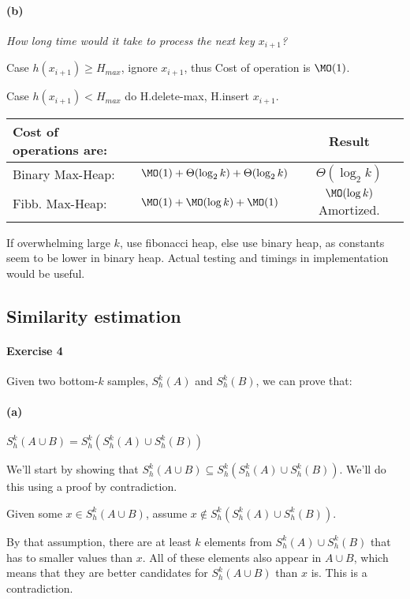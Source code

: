\paragraph*{(b)} \textit{How long time would it take to process the next key $x_{i+1}$?}

Case $h(x_{i+1}) \geq H_{max}$, ignore $x_{i+1}$, thus Cost of operation is $\MO(1)$.

Case $h(x_{i+1}) < H_{max}$ do H.delete-max, H.insert $x_{i+1}$.

\begin{tabular}{llc}
Cost of operations are: & & Result \\ \hline
Binary Max-Heap:& $\MO(1) + \Theta(\log_2 k) + \Theta(\log_2 k)$ & $\Theta(\log_2 k)$ \\
Fibb. Max-Heap: &$\MO(1) + \MO(\log k) + \MO(1)$ & $\MO(\log k)$ Amortized.
\end{tabular}


If overwhelming large $k$, use fibonacci heap, else use binary heap, as constants seem to be lower in binary heap. Actual testing and timings in implementation would be useful.

\subsection{Similarity estimation}

\paragraph{Exercise 4}
Given two bottom-$k$ samples, $S^k_h(A)$ and $S^k_h(B)$, we can prove that:

\paragraph*{(a)}
$S^k_h(A \cup B) = S^k_h(S^k_h(A) \cup S^k_h(B))$

We'll start by showing that $S^k_h(A \cup B) \subseteq S^k_h(S^k_h(A) \cup S^k_h(B))$. We'll do this using a proof by contradiction.

Given some $x \in S^k_h(A \cup B)$, assume $x \notin S^k_h(S^k_h(A) \cup S^k_h(B))$.

By that assumption, there are at least $k$ elements from $S^k_h(A) \cup S^k_h(B)$ that has to smaller values than $x$. All of these elements also appear in $A \cup B$, which means that they are better candidates for $S^k_h(A \cup B)$ than $x$ is. This is a contradiction.


